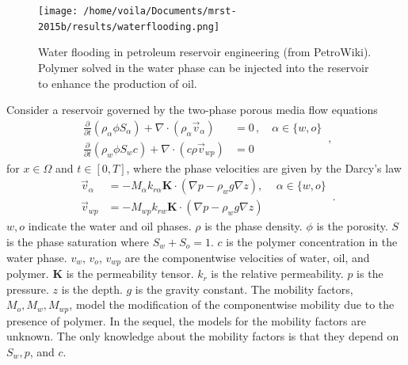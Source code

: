 \begin{figure}[htbp]
    \begin{center}
        \texttt{[image: /home/voila/Documents/mrst-2015b/results/waterflooding.png]}
        \caption{Water flooding in petroleum reservoir engineering (from PetroWiki). Polymer 
                 solved in the water phase can be injected into the reservoir to enhance the
                 production of oil.}
        \label{fig: polymer sketch}
    \end{center}
\end{figure}

Consider a reservoir governed by the two-phase porous media flow equations
\begin{equation}\begin{split}
    \frac{\partial }{\partial t} \left(\rho_\alpha \phi S_\alpha \right) + \nabla \cdot
    \left( \rho_\alpha \vec{v}_{\alpha} \right) &= 0\,, \quad \alpha \in \{w,o\}\\
    \frac{\partial}{\partial t}\left( \rho_w \phi S_w c \right) + \nabla \cdot
    \left( c \rho \vec{v}_{wp}\right) &= 0        
    \end{split}\,,
    \label{eqn: two phase polymer}
\end{equation}
for $x\in \Omega$ and $t\in [0,T]$,
where the phase velocities are given by the Darcy's law
\begin{equation}\begin{split}
    \vec{v}_\alpha &= - {M_\alpha} k_{r\alpha} \boldsymbol{K} \cdot (\nabla p - \rho_w g \nabla z), \, \quad \alpha \in \{w,o\}\\
    \vec{v}_{wp} &= -{M_{wp}} k_{rw} \boldsymbol{K} \cdot (\nabla p - \rho_{w} g \nabla z)
\end{split}\,.
\label{eqn: darcy law}
\end{equation}
$w, o$ indicate the water and oil phases.
$\rho$ is the phase density. $\phi$ is the porosity. $S$ is the phase saturation where
$S_w+S_o=1$.
$c$ is the polymer concentration in the water phase. $v_{w}$, $v_{o}$, 
$v_{wp}$ are the componentwise velocities of water, oil, and polymer. 
$\boldsymbol{K}$
is the permeability tensor. $k_{r}$ is the relative permeability. $p$ is the pressure. $z$ is the depth.
$g$ is the gravity constant. The mobility factors, $M_o, M_w, M_{wp}$, 
model the modification of the componentwise mobility due to the presence of polymer.
In the sequel, the models for the mobility factors are unknown. The only 
knowledge about the mobility factors is that they depend on $S_w, p$, and $c$.\\

